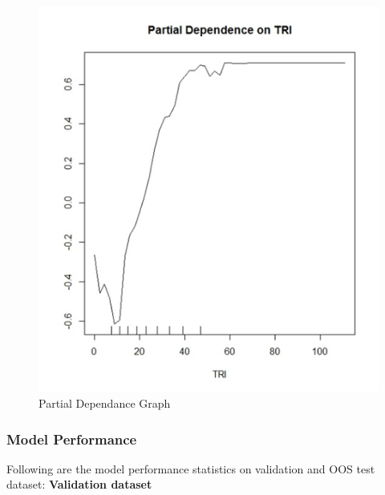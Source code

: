 \documentclass[
  letterpaper,
  DIV=11,
  numbers=noendperiod]{scrartcl}
\begin{document}
\begin{figure}

{\centering \includegraphics{Images/pdg.png}

}

\caption{Partial Dependance Graph}

\end{figure}

\hypertarget{model-performance}{%
\subsubsection{Model Performance}\label{model-performance}}

Following are the model performance statistics on validation and OOS
test dataset: \textbf{Validation dataset}
\end{document}
